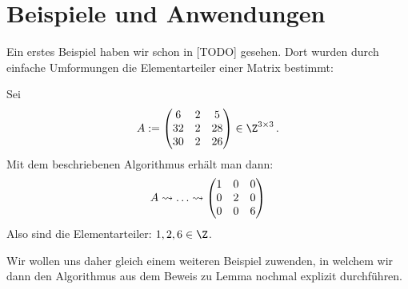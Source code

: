 
\chapter{Beispiele und Anwendungen}
Ein erstes Beispiel haben wir schon in [TODO] %
gesehen. Dort wurden durch einfache Umformungen die Elementarteiler einer Matrix
bestimmt:

\begin{thBeisp} %
    Sei 
    \[ A := \Matrix{
           6 & 2 &  5 \\
          32 & 2 & 28 \\
          30 & 2 & 26  } \in \Z^{3\times3}
    \,. \]
    Mit dem beschriebenen Algorithmus erhält man dann:
    \[
        A
        \rightsquigarrow \ldots
        \rightsquigarrow 
    \begin{pmatrix} 
        1 & 0 & 0 \\
        0 & 2 & 0 \\
        0 & 0 & 6   \end{pmatrix}
    \]
    Also sind die Elementarteiler: $1,2,6 \in\Z$.
\end{thBeisp}

Wir wollen uns daher gleich einem weiteren Beispiel zuwenden, in welchem
wir dann den Algorithmus aus dem Beweis zu Lemma %
nochmal explizit durchführen.

